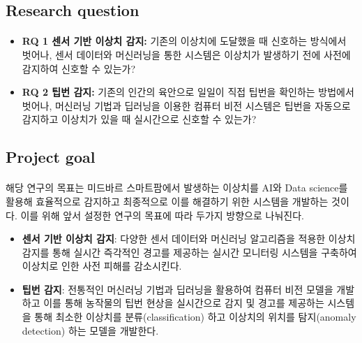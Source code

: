 \documentclass[11pt]{article}
\begin{document}
    \subsection{Research question}
    \paragraph {} 
    

    \begin{itemize}
     \item \textbf{RQ 1 센서 기반 이상치 감지:} 기존의 이상치에 도달했을 때 신호하는 방식에서 벗어나, 센서 데이터와 머신러닝을 통한 시스템은 이상치가 발생하기 전에 사전에 감지하여 신호할 수 있는가?
    
     \item \textbf{RQ 2 팁번 감지:} 기존의 인간의 육안으로 일일이 직접 팁번을 확인하는 방법에서 벗어나, 머신러닝 기법과 딥러닝을 이용한 컴퓨터 비전 시스템은 팁번을 자동으로 감지하고 이상치가 있을 때 실시간으로 신호할 수 있는가?
    \end{itemize} 

    \subsection{Project goal}
    \paragraph {} 해당 연구의 목표는 미드바르 스마트팜에서 발생하는 이상치를 AI와 Data science를 활용해 효율적으로 감지하고 최종적으로 이를 해결하기 위한 시스템을 개발하는 것이다. 이를 위해 앞서 설정한 연구의 목표에 따라 두가지 방향으로 나눠진다.

    \begin{itemize}
        \item {\textbf{센서 기반 이상치 감지}: 다양한 센서 데이터와 머신러닝 알고리즘을 적용한 이상치 감지를 통해 실시간 즉각적인 경고를 제공하는 실시간 모니터링 시스템을 구축하여 이상치로 인한 사전 피해를 감소시킨다.}

        \item {\textbf{팁번 감지}: 전통적인 머신러닝 기법과 딥러닝을 활용하여 컴퓨터 비전 모델을 개발하고 이를 통해 농작물의 팁번 현상을 실시간으로 감지 및 경고를 제공하는 시스템을 통해 최소한 이상치를 분류(classification) 하고 이상치의 위치를 탐지(anomaly detection) 하는 모델을 개발한다.}

    \end{itemize}
\end{document}
